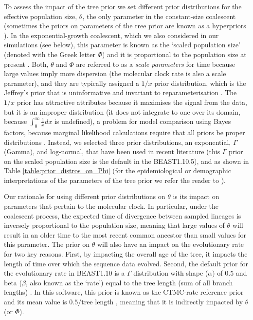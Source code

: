 \documentclass[10pt,letterpaper]{article}
\begin{document}
To assess the impact of the tree prior we set different prior distributions for the effective population size, $\theta$, the only parameter in the constant-size coalescent (sometimes the priors on parameters of the tree prior are known as a hyperpriors \cite{heath2014bayesian}). In the exponential-growth coalescent, which we also considered in our simulations (see below), this parameter is known as the `scaled population size' (denoted with the Greek letter $\Phi$) and it is proportional to the population size at present \cite{boskova2014inference}. Both, $\theta$ and $\Phi$ are referred to as a \textit{scale parameters} for time because large values imply more dispersion (the molecular clock rate is also a scale parameter), and they are typically assigned a $1/x$ prior distribution, which is the Jeffrey's prior that is uninformative and invariant to reparameterisation  \cite{drummond2002estimating}. The $1/x$ prior has attractive attributes because it maximises the signal from the data, but it is an improper distribution (it does not integrate to one over its domain, because $\int_{0}^{\infty} \frac{1}{x}dx$ is undefined), a problem for model comparison using Bayes factors, because marginal likelihood calculations require that all priors be proper distributions \cite{r2019marginal, baele2013proper}. {Instead, we selected three prior distributions, an exponential, $\Gamma$ (Gamma), and log-normal, that have been used in recent literature \cite{vogels2023phylogeographic} (this $\Gamma$ prior on the scaled population size is the default in the BEAST1.10.5), and as shown in Table \ref{table:prior_distros_on_Phi} (for the epidemiological or demographic interpretations of the parameters of the tree prior we refer the reader to \cite{featherstone2021infectious, drummond2002estimating}).}

Our rationale for using different prior distributions on $\theta$ is its impact on parameters that pertain to the molecular clock. In particular, under the coalescent process, the expected time of divergence between sampled lineages is inversely proportional to the population size, meaning that large values of $\theta$ will result in an older time to the most recent common ancestor than small values for this parameter. The prior on $\theta$ will also have an impact on the evolutionary rate for two key reasons. First, by impacting the overall age of the tree, it impacts the length of time over which the sequence data evolved. Second, the default prior for the evolutionary rate in BEAST1.10 is a $\Gamma$ distribution with shape ($\alpha$) of 0.5 and beta ($\beta$, also known as the `rate') equal to the tree length (sum of all branch lengths) \cite{wang2014priors, ferreira2008bayesian}. In this software, this prior is known as the CTMC-rate reference prior and its mean value is $0.5 /$tree length \cite{ferreira2008bayesian, gao2023model, gao2023prioritree}, meaning that it is indirectly impacted by $\theta$ (or $\Phi$). 
\end{document}
